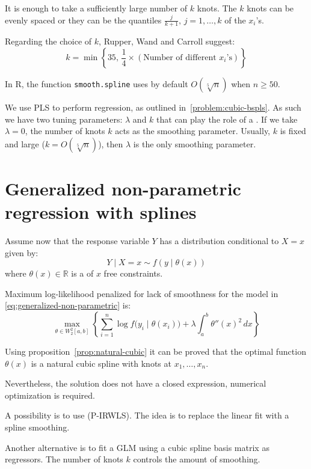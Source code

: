 It is enough to take a sufficiently large number of $k$ knots. The
$k$ knots can be evenly spaced or they can be the quantiles
$\frac{j}{k+1},\,j=1,\ldots,k$ of the $x_i$'s.

Regarding the choice of $k$, Rupper, Wand and Carroll suggest:
\begin{equation*}
    k = \min \left\{
        35,\, \frac{1}{4} \times \left( \text{Number of different $x_i$'s} \right)
    \right\}
\end{equation*}

In R, the function \texttt{smooth.spline} uses by default $O\left(\sqrt[5]n\right)$ when
$n \geq 50$.

We use PLS to perform regression, as outlined in~\ref{problem:cubic-bspls}. As such we
have two tuning parameters: $\lambda$ and $k$ that can play the role
of a . If we take $\lambda=0$, the number
of knots $k$ acts as the smoothing parameter. Usually, $k$ is
fixed and large ($k = O(\sqrt[5]n)$), then $\lambda$ is the
only smoothing parameter.

\section{Generalized non-parametric regression with splines}

Assume now that the response variable $Y$ has a distribution conditional
to $X = x$ given by:
\begin{equation}\label{eq:generalized-non-parametric}
    Y \mid X=x \sim f(y \mid \theta(x))
\end{equation}
where $\theta(x) \in \mathds{R}$ is a  of
$x$ free constraints.

\begin{problem}{Maximum log-likelihood penalized for lack of smoothness}{}
    for the model in \cref{eq:generalized-non-parametric} is:
    \begin{equation*}
        \max_{\theta \in W_2^2[a,b]} \left \{
            \sum_{i=1}^n \log f\bigl(y_i \mid \theta(x_i)\bigr)
            + \lambda \int_a^b \theta''(x)^2\,dx
            \right \}
    \end{equation*}
\end{problem}

Using proposition~\ref{prop:natural-cubic} it can be proved that the optimal
function $\theta(x)$ is a natural cubic spline with knots at $x_1,\ldots,x_n$.

\begin{note}
Nevertheless, the solution does not have a closed expression, numerical
optimization is required.
\end{note}

A possibility is to use 
(P-IRWLS). The idea is to replace the linear fit
with a spline smoothing.

Another alternative is to fit a GLM using a cubic spline basis matrix as
regressors. The number of knots $k$ controls the amount of smoothing.

